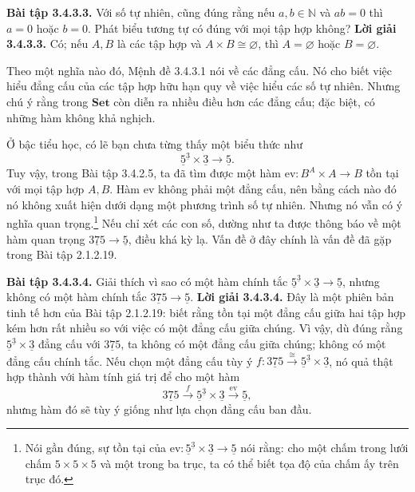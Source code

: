 \noindent\textbf{Bài tập 3.4.3.3.} Với số tự nhiên, cũng đúng rằng nếu $a,b\in\mathbb N$ và $ab=0$ thì $a=0$ hoặc $b=0$. Phát biểu tương tự có đúng với mọi tập hợp không?
\noindent\textbf{Lời giải 3.4.3.3.} Có; nếu $A,B$ là các tập hợp và $A\times B\cong\varnothing$, thì $A=\varnothing$ hoặc $B=\varnothing$.

Theo một nghĩa nào đó, Mệnh đề 3.4.3.1 nói về các đẳng cấu. Nó cho biết việc hiểu đẳng cấu của các tập hợp hữu hạn quy về việc hiểu các số tự nhiên. Nhưng chú ý rằng trong $\mathbf{Set}$ còn diễn ra nhiều điều hơn các đẳng cấu; đặc biệt, có những hàm không khả nghịch.

Ở bậc tiểu học, có lẽ bạn chưa từng thấy một biểu thức như
\[\underline5^{\underline3}\times\underline3\longrightarrow\underline5.\]
Tuy vậy, trong Bài tập 3.4.2.5, ta đã tìm được một hàm $\mathrm{ev}:B^A\times A\to B$ tồn tại với mọi tập hợp $A,B$. Hàm $\mathrm{ev}$ không phải một đẳng cấu, nên bằng cách nào đó nó không xuất hiện dưới dạng một phương trình số tự nhiên. Nhưng nó vẫn có ý nghĩa quan trọng.\footnote{Nói gần đúng, sự tồn tại của $\mathrm{ev}:\underline5^{\underline3}\times\underline3\to\underline5$ nói rằng: cho một chấm trong lưới chấm $5\times5\times5$ và một trong ba trục, ta có thể biết tọa độ của chấm ấy trên trục đó.} Nếu chỉ xét các con số, dường như ta được thông báo về một hàm quan trọng $\underline{375}\to\underline5$, điều khá kỳ lạ. Vấn đề ở đây chính là vấn đề đã gặp trong Bài tập 2.1.2.19.

\noindent\textbf{Bài tập 3.4.3.4.} Giải thích vì sao có một hàm chính tắc $\underline5^{\underline3}\times\underline3\to\underline5$, nhưng không có một hàm chính tắc $\underline{375}\to\underline5$.
\noindent\textbf{Lời giải 3.4.3.4.} Đây là một phiên bản tinh tế hơn của Bài tập 2.1.2.19: biết rằng tồn tại một đẳng cấu giữa hai tập hợp kém hơn rất nhiều so với việc có một đẳng cấu giữa chúng. Vì vậy, dù đúng rằng $\underline5^{\underline3}\times\underline3$ đẳng cấu với $\underline{375}$, ta không có một đẳng cấu giữa chúng; không có một đẳng cấu chính tắc. Nếu chọn một đẳng cấu tùy ý $f:\underline{375}\xrightarrow{\cong}\underline5^{\underline3}\times\underline3$, nó quả thật hợp thành với hàm tính giá trị để cho một hàm
\[\underline{375}\xrightarrow{f}\underline5^{\underline3}\times\underline3\xrightarrow{\mathrm{ev}}\underline5,\]
nhưng hàm đó sẽ tùy ý giống như lựa chọn đẳng cấu ban đầu.

